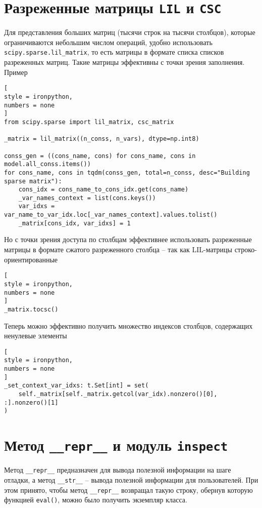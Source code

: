 \documentclass[%
	11pt,
	a4paper,
	utf8,
		]{article}
\begin{document}
\section{Разреженные матрицы \texttt{LIL} и \texttt{CSC}}

Для представления больших матриц (тысячи строк на тысячи столбцов), которые ограничиваются небольшим числом операций, удобно использовать \verb|scipy.sparse.lil_matrix|, то есть матрицы в формате списка списков разреженных матриц. Такие матрицы эффективны с точки зрения заполнения. Пример
\begin{lstlisting}[
style = ironpython,
numbers = none
]
from scipy.sparse import lil_matrix, csc_matrix

_matrix = lil_matrix((n_conss, n_vars), dtype=np.int8)

conss_gen = ((cons_name, cons) for cons_name, cons in model.all_conss.items())
for cons_name, cons in tqdm(conss_gen, total=n_conss, desc="Building sparse matrix"):
	cons_idx = cons_name_to_cons_idx.get(cons_name)
	_var_names_context = list(cons.keys())
	var_idxs = var_name_to_var_idx.loc[_var_names_context].values.tolist()
	_matrix[cons_idx, var_idxs] = 1
\end{lstlisting}

Но с точки зрения доступа по столбцам эффективнее использовать разреженные матрицы в формате сжатого разреженного столбца -- так как LIL-матрицы строко-ориентированные
\begin{lstlisting}[
style = ironpython,
numbers = none
]
_matrix.tocsc()
\end{lstlisting}

Теперь можно эффективно получить множество индексов столбцов, содержащих ненулевые элементы
\begin{lstlisting}[
style = ironpython,
numbers = none
]
_set_context_var_idxs: t.Set[int] = set(
    self._matrix[self._matrix.getcol(var_idx).nonzero()[0], :].nonzero()[1]
)
\end{lstlisting}





\section{Метод \texttt{\_\_repr\_\_} и модуль \texttt{inspect}}

Метод \verb|__repr__| предназначен для вывода полезной информации на шаге отладки, а метод \verb|__str__| -- вывода полезной информации для пользователей. При этом принято, чтобы метод \verb|__repr__| возвращал такую строку, обернув которую функцией \verb|eval()|, можно было получить экземпляр класса.
	
\end{document}
